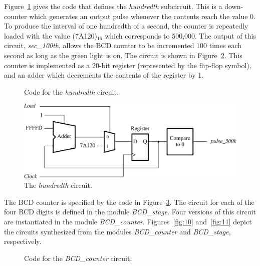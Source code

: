 \documentclass[11pt, twoside, pdftex]{article}
\begin{document}
Figure~\ref{fig:7} gives the code that defines the {\it hundredth} subcircuit. This is a 
down-counter which generates an output pulse
whenever the contents reach the value 0. To produce the interval of one hundredth
of a second, the counter is repeatedly loaded with the value (7A120)$_{16}$ which
corresponds to 500,000. The output of this circuit, {\it sec\_100th}, allows
the BCD counter to be incremented 100 times each second
as long as the green light is on. The circuit is shown in Figure~\ref{fig:8}. This
counter is implemented as a 20-bit register (represented by the flip-flop symbol),
and an adder which decrements the contents of the register by 1.

\begin{figure}[H]

	\caption{Code for the {\it hundredth} circuit.}
	\label{fig:7}
\end{figure}
 
\begin{figure}[H]
   \begin{center}
      \includegraphics[scale=1]{figures/figure8.png}
   \caption{The {\it hundredth} circuit.} 
	 \label{fig:8}
	 \end{center}
\end{figure}

The BCD counter is specified by the code in Figure~\ref{fig:9}.
The circuit for each of the four BCD digits is defined in the module {\it BCD\_stage}.
Four versions of this circuit are instantiated in the module {\it BCD\_counter}.
Figures~\ref{fig:10} and~\ref{fig:11} depict the circuits synthesized from the modules {\it BCD\_counter}
and {\it BCD\_stage}, respectively.

\begin{figure}[H]

  \vspace{-0.5cm}
	\caption{Code for the {\it BCD\_counter} circuit.}
	\label{fig:9}
\end{figure}
\end{document}
